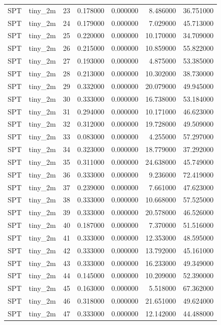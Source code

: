\begin{tabular}{llrrrrr}
SPT & tiny_2m & 23 & 0.178000 & 0.000000 & 8.486000 & 36.751000 \\
SPT & tiny_2m & 24 & 0.179000 & 0.000000 & 7.029000 & 45.713000 \\
SPT & tiny_2m & 25 & 0.220000 & 0.000000 & 10.170000 & 34.709000 \\
SPT & tiny_2m & 26 & 0.215000 & 0.000000 & 10.859000 & 55.822000 \\
SPT & tiny_2m & 27 & 0.193000 & 0.000000 & 4.875000 & 53.385000 \\
SPT & tiny_2m & 28 & 0.213000 & 0.000000 & 10.302000 & 38.730000 \\
SPT & tiny_2m & 29 & 0.332000 & 0.000000 & 20.079000 & 49.945000 \\
SPT & tiny_2m & 30 & 0.333000 & 0.000000 & 16.738000 & 53.184000 \\
SPT & tiny_2m & 31 & 0.294000 & 0.000000 & 10.171000 & 46.623000 \\
SPT & tiny_2m & 32 & 0.312000 & 0.000000 & 19.728000 & 49.509000 \\
SPT & tiny_2m & 33 & 0.083000 & 0.000000 & 4.255000 & 57.297000 \\
SPT & tiny_2m & 34 & 0.323000 & 0.000000 & 18.779000 & 37.292000 \\
SPT & tiny_2m & 35 & 0.311000 & 0.000000 & 24.638000 & 45.749000 \\
SPT & tiny_2m & 36 & 0.333000 & 0.000000 & 9.236000 & 72.419000 \\
SPT & tiny_2m & 37 & 0.239000 & 0.000000 & 7.661000 & 47.623000 \\
SPT & tiny_2m & 38 & 0.333000 & 0.000000 & 10.668000 & 57.525000 \\
SPT & tiny_2m & 39 & 0.333000 & 0.000000 & 20.578000 & 46.526000 \\
SPT & tiny_2m & 40 & 0.187000 & 0.000000 & 7.370000 & 51.516000 \\
SPT & tiny_2m & 41 & 0.333000 & 0.000000 & 12.353000 & 48.595000 \\
SPT & tiny_2m & 42 & 0.333000 & 0.000000 & 13.792000 & 45.161000 \\
SPT & tiny_2m & 43 & 0.333000 & 0.000000 & 16.233000 & 49.349000 \\
SPT & tiny_2m & 44 & 0.145000 & 0.000000 & 10.209000 & 52.390000 \\
SPT & tiny_2m & 45 & 0.163000 & 0.000000 & 5.518000 & 67.362000 \\
SPT & tiny_2m & 46 & 0.318000 & 0.000000 & 21.651000 & 49.624000 \\
SPT & tiny_2m & 47 & 0.333000 & 0.000000 & 12.142000 & 44.488000 \\

\end{tabular}
